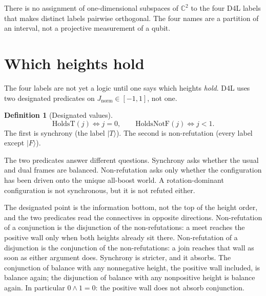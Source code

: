 \documentclass[a4paper]{article}
\theoremstyle{definition}
\newtheorem{definition}[theorem]{Definition}
\newcommand{\Jnorm}{J_{\mathrm{norm}}}
\begin{document}
There is no assignment of one-dimensional subspaces of \(\mathbb{C}^2\)
to the four D4L labels that makes distinct labels pairwise orthogonal.
The four names are a partition of an interval, not a projective
measurement of a qubit.

\section{Which heights hold}
\label{sec:cons}

The four labels are not yet a logic until one says which heights
\emph{hold}. D4L uses two designated predicates on \(\Jnorm\in[-1,1]\),
not one.

\begin{definition}[Designated values]
\label{def:desig}
\[
\mathrm{HoldsT}(j)\iff j=0,
\qquad
\mathrm{HoldsNotF}(j)\iff j<1.
\]
The first is synchrony (the label \(\lvert T\rangle\)). The second is
non-refutation (every label except \(\lvert F\rangle\)).
\end{definition}

The two predicates answer different questions. Synchrony asks whether
the usual and dual frames are balanced. Non-refutation asks only
whether the configuration has been driven onto the unique all-boost
world. A rotation-dominant configuration is not synchronous, but it is
not refuted either.

The designated point is the information bottom, not the top of the
height order, and the two predicates read the connectives in opposite
directions. Non-refutation of a conjunction is the disjunction of the
non-refutations: a meet reaches the positive wall only when both
heights already sit there. Non-refutation of a disjunction is the
conjunction of the non-refutations: a join reaches that wall as soon
as either argument does. Synchrony is stricter, and it absorbs. The
conjunction of balance with any nonnegative height, the positive wall
included, is balance again; the disjunction of balance with any
nonpositive height is balance again. In particular \(0\wedge 1=0\):
the positive wall does not absorb conjunction.
\end{document}
